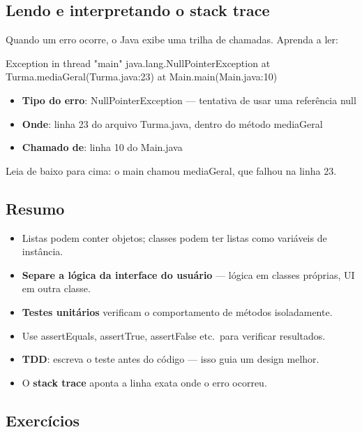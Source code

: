\documentclass[11pt,a4paper]{article}
\renewcommand{\texttt}[1]{{\color{javaCodeInline}\small\ttfamily #1}}
\begin{document}
\subsection{Lendo e interpretando o stack trace}

Quando um erro ocorre, o Java exibe uma trilha de chamadas. Aprenda a ler:

\begin{javacode}
Exception in thread "main" java.lang.NullPointerException
    at Turma.mediaGeral(Turma.java:23)
    at Main.main(Main.java:10)
\end{javacode}

\begin{itemize}
\item \textbf{Tipo do erro}: \texttt{NullPointerException} --- tentativa de usar uma referência \texttt{null}
\item \textbf{Onde}: linha 23 do arquivo \texttt{Turma.java}, dentro do método \texttt{mediaGeral}
\item \textbf{Chamado de}: linha 10 do \texttt{Main.java}
\end{itemize}

Leia de baixo para cima: o \texttt{main} chamou \texttt{mediaGeral}, que falhou na linha 23.

\subsection{Resumo}

\begin{itemize}
\item Listas podem conter objetos; classes podem ter listas como variáveis de instância.
\item \textbf{Separe a lógica da interface do usuário} --- lógica em classes próprias, UI em outra classe.
\item \textbf{Testes unitários} verificam o comportamento de métodos isoladamente.
\item Use \texttt{assertEquals}, \texttt{assertTrue}, \texttt{assertFalse} etc.\ para verificar resultados.
\item \textbf{TDD}: escreva o teste antes do código --- isso guia um design melhor.
\item O \textbf{stack trace} aponta a linha exata onde o erro ocorreu.
\end{itemize}

\subsection{Exercícios}
\end{document}
